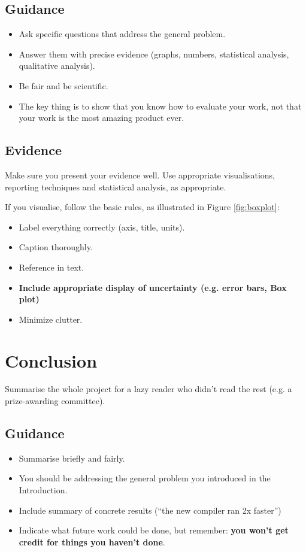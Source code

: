 \documentclass{l4proj}
\begin{document}
\section{Guidance}
\begin{itemize}
    \item
        Ask specific questions that address the general problem.
    \item
        Answer them with precise evidence (graphs, numbers, statistical
        analysis, qualitative analysis).
    \item
        Be fair and be scientific.
    \item
        The key thing is to show that you know how to evaluate your work, not
        that your work is the most amazing product ever.
\end{itemize}

\section{Evidence}
Make sure you present your evidence well. Use appropriate visualisations, reporting techniques and statistical analysis, as appropriate.

If you visualise, follow the basic rules, as illustrated in Figure \ref{fig:boxplot}:
\begin{itemize}
\item Label everything correctly (axis, title, units).
\item Caption thoroughly.
\item Reference in text.
\item \textbf{Include appropriate display of uncertainty (e.g. error bars, Box plot)}
\item Minimize clutter.
\end{itemize}



\chapter{Conclusion}    
Summarise the whole project for a lazy reader who didn't read the rest (e.g. a prize-awarding committee).
\section{Guidance}
\begin{itemize}
    \item
        Summarise briefly and fairly.
    \item
        You should be addressing the general problem you introduced in the
        Introduction.        
    \item
        Include summary of concrete results (``the new compiler ran 2x
        faster'')
    \item
        Indicate what future work could be done, but remember: \textbf{you
        won't get credit for things you haven't done}.
\end{itemize}
\end{document}
